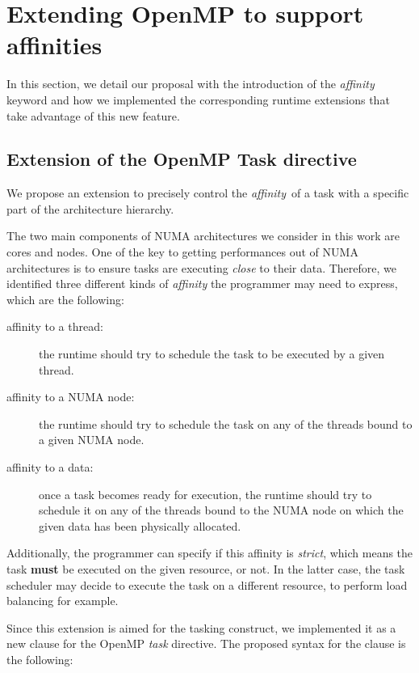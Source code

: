 \documentclass{Styles/llncs}
\begin{document}
\section{Extending OpenMP to support affinities}

In this section, we detail our proposal with the introduction
of the \emph{affinity} keyword and how we implemented the corresponding runtime extensions
that take advantage of this new feature.


\subsection{Extension of the OpenMP Task directive}

We propose an extension to precisely control the \emph{affinity} of a task with a specific part of the architecture hierarchy.

The two main components of NUMA architectures we consider in this work are cores and nodes. One of
the key to getting performances out of NUMA architectures is to ensure tasks are
executing \emph{close} to their data.
Therefore, we identified three different kinds of \emph{affinity} the programmer
may need to express, which are the following:
\begin{description}
    \item [affinity to a thread:]
      the runtime should try to schedule the task to be executed by a given thread.

    \item [affinity to a NUMA node:]
      the runtime should try to schedule the task on any of the threads bound to
      a given NUMA node.

    \item [affinity to a data:]
      once a task becomes ready for execution, the runtime should try to schedule it on any of the threads bound to the NUMA node on which the given data has been physically allocated.
\end{description}

Additionally, the programmer can specify if this affinity is \emph{strict}, which means the task \textbf{must} be executed on the given resource, or not. In the latter case, the task scheduler may decide to execute the task on a different resource, to perform load balancing for example.

Since this extension is aimed for the tasking construct, we implemented it as a new
clause for the OpenMP \emph{task} directive. The proposed syntax for the clause is the following:
\end{document}

